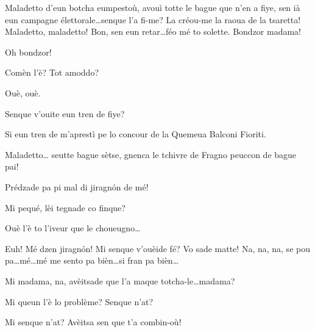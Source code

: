 \begin{drama}



\Cimaspeaks Maladetto d'eun botcha eumpestoù, avouì totte le bague que n'en a fiye, sen ià eun campagne élettorale\ldots senque l'a fi-me? La créou-me la raoua de la tsaretta! Maladetto, maladetto! Bon, sen eun retar\ldots féo mé to solette. Bondzor madama!

\Saventaspeaks Oh bondzor!

\Cimaspeaks Comèn l'è? Tot amoddo?

\Saventaspeaks Ouè, ouè.

\Cimaspeaks Senque v'ouite eun tren de fiye?

\Saventaspeaks Si eun tren de m'aprestì pe lo concour de la Quemeua Balconi Fioriti.

\Cimaspeaks Maladetto\ldots {} seutte bague sètse, gnenca le tchivre de Fragno peuccon de bague pai!

\Saventaspeaks Prédzade pa pi mal di jiragn\'on de mé!

\Cimaspeaks Mi pequé, lèi tegnade co finque?

\Saventaspeaks Ouè l'è to l'iveur que le choueugno\ldots


\Saventaspeaks {} Euh! Mé dzen jiragn\'on! Mi senque v'ouèide fé? Vo sade matte! Na, na, na, se pou pa\ldots mé\ldots mé me sento pa bièn\ldots si fran pa bièn\ldots


\Cimaspeaks Mi madama, na, avèitsade que l'a maque totcha-le\ldots madama?

\Marcospeaks {} Mi queun l'è lo problème? Senque n'at?

\Cimaspeaks Mi senque n'at? Avèitsa sen que t'a combin-où!


\end{drama}
